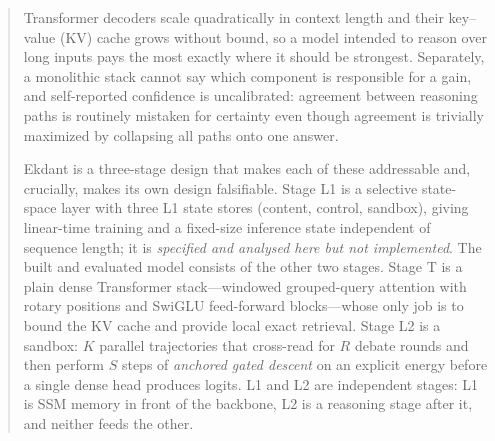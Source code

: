 \documentclass[11pt,a4paper]{article}
\theoremstyle{plain}
\theoremstyle{definition}
\theoremstyle{remark}
\begin{document}
\pagestyle{plain}

\begin{abstract}
\noindent
Transformer decoders scale quadratically in context length and their
key--value (KV) cache grows without bound, so a model intended to reason over
long inputs pays the most exactly where it should be strongest. Separately, a
monolithic stack cannot say which component is responsible for a gain, and
self-reported confidence is uncalibrated: agreement between reasoning paths is
routinely mistaken for certainty even though agreement is trivially maximized
by collapsing all paths onto one answer.

\noindent
Ekdant is a three-stage design that makes each of these addressable and,
crucially, makes its own design falsifiable. Stage L1 is a selective
state-space layer with three L1 state stores (content, control, sandbox), giving
linear-time training and a fixed-size inference state independent of sequence
length; it is \emph{specified and analysed here but not implemented}. The
built and evaluated model consists of the other two stages. Stage T is a plain
dense Transformer stack---windowed grouped-query attention with rotary
positions and SwiGLU feed-forward blocks---whose only job is to bound the KV
cache and provide local exact retrieval. Stage L2 is a sandbox: $K$ parallel
trajectories that cross-read for $R$ debate rounds and then perform $S$ steps
of \emph{anchored gated descent} on an explicit energy before a single dense
head produces logits. L1 and L2 are independent stages: L1 is SSM memory in
front of the backbone, L2 is a reasoning stage after it, and neither feeds the
other.


\end{abstract}
\end{document}
